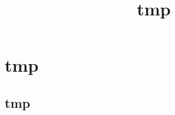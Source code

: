 \documentclass[11pt,a4paper]{article}
\title{tmp}
\begin{document}
\section{tmp}
\subsection{tmp}

\end{document}
